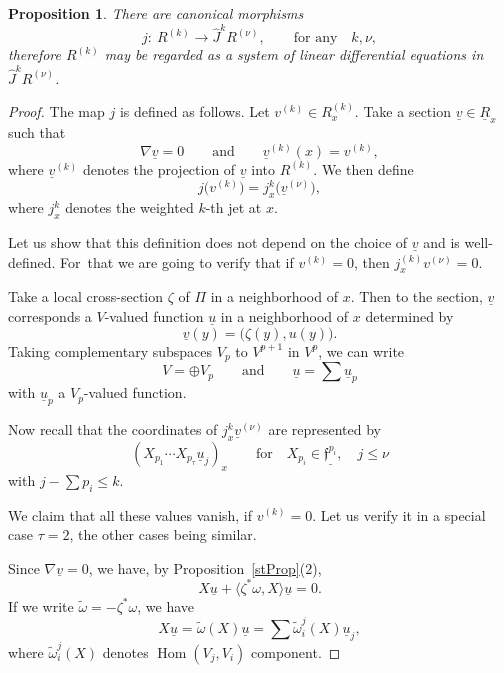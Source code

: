 \documentclass[10pt,a4paper]{amsart}
\newcommand{\f}{\mathfrak f}
\newcommand{\wJ}{\widehat J}
\newcommand{\Hom}{\operatorname{Hom}}
\newtheorem{prop}[thm]{Proposition}
\numberwithin{equation}{section}
\begin{document}
\begin{prop}\label{rprop3}
	There are canonical morphisms
	\[
	j \colon\ R^{(k)} \to \wJ^{k} R^{(\nu)}, \qquad\text{for any}\quad k,\nu,
	\]
	therefore $ R^{(k)}$ may be regarded as a system of linear differential equations
	in $\wJ^{k} R^{(\nu)}$.
\end{prop}
\begin{proof}
	The map $j$ is defined as follows. Let $v^{(k)}\in R^{(k)}_x$. Take a section $\underline v\in \underline R_x$ such that
	\[
	\nabla \underline v = 0\qquad\text{and}\qquad \underline v^{(k)}(x) = v^{(k)},
	\]
	where $\underline{v}^{(k)}$ denotes the projection of $\underline{v}$ into $R^{(k)}$. We then define
	\[
	j\big(v^{(k)}\big) = j_x^{k}\big(\underline v^{(\nu)}\big),
	\]
	where $j_x^{k}$ denotes the weighted $k$-th jet at $x$.
	
	Let us show that this definition does not depend on the choice of $\underline v$ and is well-defined. For~that we are going to verify that if $v^{(k)}=0$, then $j_x^{(k)}v^{(\nu)}=0$.
	
	Take a local cross-section $\zeta$ of $\Pi$ in a neighborhood of $x$. Then to the section, $\underline v$ corresponds a $V$-valued function $\underline u$ in a neighborhood of $x$ determined by
	\[
	\underline v(y) = \big(\zeta(y), u(y)\big).
	\]
	Taking complementary subspaces $V_p$ to $V^{p+1}$ in $V^p$, we can write
	\[
	V = \oplus V_p\qquad\text{and}\qquad \underline u = \sum \underline u_p
	\]
	with $\underline u_p$ a $V_p$-valued function.

	Now recall that the coordinates of $j^k_x\underline v^{(\nu)}$ are represented by
\[
\left(X_{p_1}\cdots X_{p_\tau}\underline u_j\right)_x\qquad\text{for}\quad X_{p_i}\in \underline{\f^{p_i}},\quad j\le \nu
\]
with $j-\sum p_i\le k$.
	
We claim that all these values vanish, if $v^{(k)}=0$. Let us verify it in a special case $\tau=2$, the other cases being similar.
	
	Since $\nabla \underline v =0 $, we have, by Proposition~\ref{stProp}(2),
	\[
	X \underline u + \langle \zeta^*\omega, X\rangle \underline u = 0.
	\]
If we write $\tilde\omega = -\zeta^*\omega$, we have
	\[
	X\underline{u} = \tilde\omega(X)\underline u = \sum\tilde\omega^j_i(X)\underline u_j,
	\]
	where $\tilde\omega^j_i(X)$ denotes $\Hom(V_j,V_i)$ component.
	

\end{proof}
\end{document}
